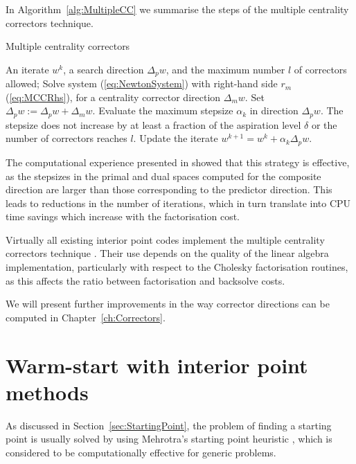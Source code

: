 In Algorithm~\ref{alg:MultipleCC} we summarise the steps of the
multiple centrality correctors technique.
\begin{algorithm}[ht]
  \caption{Multiple centrality correctors}
    \begin{algorithmic}[0]  \label{alg:MultipleCC}
      \REQUIRE An iterate $w^k$, a search direction $\Delta_p w$,
               and the maximum number $l$ of correctors allowed;
        \smallskip
        \REPEAT
           \STATE Solve system (\ref{eq:NewtonSystem}) with right-hand side
                  $r_m$ (\ref{eq:MCCRhs}), for a centrality
                 corrector direction $\Delta_m w$.
           \smallskip
           \STATE Set $\Delta_p w := \Delta_p w + \Delta_m w$.
           \smallskip
	   \STATE Evaluate the maximum stepsize $\alpha_k$ in direction
	          $\Delta_p w$.
           \smallskip
        \UNTIL The stepsize does not increase by at least a fraction of
	       the aspiration level $\delta$ or the number of correctors 
               reaches $l$.
        \smallskip
        \STATE Update the iterate $w^{k+1} = w^k + \alpha_k\Delta_p w$.
  \end{algorithmic}
\end{algorithm}

The computational experience presented in \cite{Gondzio96} showed 
that this strategy is effective, as the stepsizes in the primal and 
dual spaces computed for the composite direction are larger than 
those corresponding to the predictor direction. 
This leads to reductions in the number of iterations, which in turn 
translate into CPU time savings which increase with the factorisation
cost.

Virtually all existing interior point codes implement the multiple
centrality correctors technique
\cite[Appendix B]{ipm:Wright97}.
Their use depends on the quality of the linear algebra implementation,
particularly with respect to the Cholesky factorisation routines,
as this affects the ratio between factorisation and backsolve costs.

We will present further improvements in the way corrector directions
can be computed in Chapter~\ref{ch:Correctors}.


%
%
\section{Warm-start with interior point methods}
\label{sec:WarmStart}

As discussed in Section~\ref{sec:StartingPoint}, the problem of 
finding a starting point is usually solved by using 
Mehrotra's starting point heuristic \cite{Mehrotra92}, which is 
considered to be computationally effective for generic problems.

